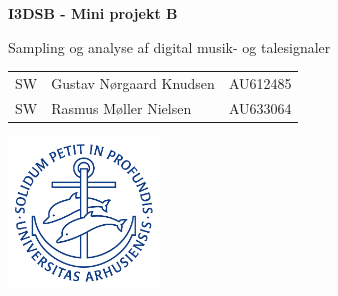 \documentclass{article}
\begin{document}

\begin{titlepage}
  \begin{center}
    
    \vspace*{1cm}
    \Huge
    \textbf{I3DSB - Mini projekt B}

    \vspace{0.5cm}
    \huge
    Sampling og analyse af digital musik- og talesignaler \\
    \date\today

    \vfill

    \Large
    \begin{tabular}{llr}
      SW & Gustav Nørgaard Knudsen & AU612485 \\
      SW & Rasmus Møller Nielsen & AU633064\\
    \end{tabular}
    
    \vfill
    \includegraphics[width=0.3\textwidth]{au2}
    \vspace{2cm}

  \end{center}
\end{titlepage}

\newpage
\newpage

\setcounter{page}{1}





\end{document}
